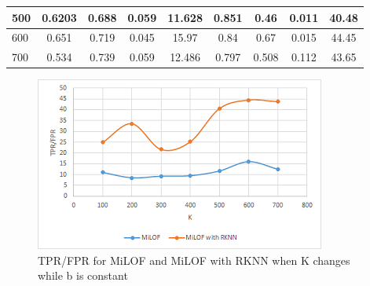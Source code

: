 \begin{table}[H]
\begin{tabular}{|l|c|c|c|c|c|c|c|c|}
		500                       & 0.6203                         & 0.688                              & 0.059                    & 11.628                       & 0.851                          & 0.46                               & 0.011                    & 40.48                        \\ \hline
		600                       & 0.651                          & 0.719                              & 0.045                    & 15.97                        & 0.84                           & 0.67                               & 0.015                    & 44.45                        \\ \hline
		700                       & 0.534                          & 0.739                              & 0.059                    & 12.486                       & 0.797                          & 0.508                              & 0.112                    & 43.65                        \\ \hline
	\end{tabular}
\end{table}



\begin{figure}[H]
	\centering
	\includegraphics{chap04/varyK2.png}
	\caption{TPR/FPR for MiLOF and MiLOF with RKNN when K changes while b is constant}
\end{figure}



